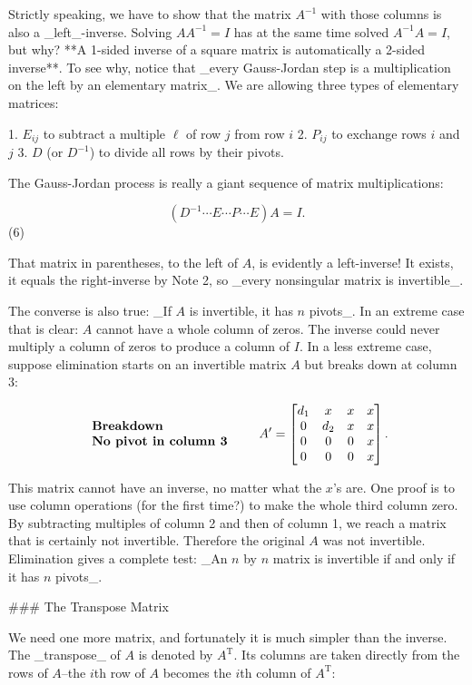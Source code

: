 Strictly speaking, we have to show that the matrix \(A^{-1}\) with those columns is also a _left_-inverse. Solving \(AA^{-1}=I\) has at the same time solved \(A^{-1}A=I\), but why? **A 1-sided inverse of a square matrix is automatically a 2-sided inverse**. To see why, notice that _every Gauss-Jordan step is a multiplication on the left by an elementary matrix_. We are allowing three types of elementary matrices:

1. \(E_{ij}\) to subtract a multiple \(\ell\) of row \(j\) from row \(i\)
2. \(P_{ij}\) to exchange rows \(i\) and \(j\)
3. \(D\) (or \(D^{-1}\)) to divide all rows by their pivots.

The Gauss-Jordan process is really a giant sequence of matrix multiplications:

\[(D^{-1}\cdots E\cdots P\cdots E)A=I.\] (6)

That matrix in parentheses, to the left of \(A\), is evidently a left-inverse! It exists, it equals the right-inverse by Note 2, so _every nonsingular matrix is invertible_.

The converse is also true: _If \(A\) is invertible, it has \(n\) pivots_. In an extreme case that is clear: \(A\) cannot have a whole column of zeros. The inverse could never multiply a column of zeros to produce a column of \(I\). In a less extreme case, suppose elimination starts on an invertible matrix \(A\) but breaks down at column 3:

\[\begin{array}{l}\mbox{\bf Breakdown}\\ \mbox{\bf No pivot in column 3}\end{array}\qquad A^{\prime}=\begin{bmatrix}d_{1}&x&x&x \\ 0&d_{2}&x&x\\ 0&0&0&x\\ 0&0&0&x\end{bmatrix}.\]

This matrix cannot have an inverse, no matter what the \(x\)'s are. One proof is to use column operations (for the first time?) to make the whole third column zero. By subtracting multiples of column 2 and then of column 1, we reach a matrix that is certainly not invertible. Therefore the original \(A\) was not invertible. Elimination gives a complete test: _An \(n\) by \(n\) matrix is invertible if and only if it has \(n\) pivots_.

### The Transpose Matrix

We need one more matrix, and fortunately it is much simpler than the inverse. The _transpose_ of \(A\) is denoted by \(A^{\mathrm{T}}\). Its columns are taken directly from the rows of \(A\)--the \(i\)th row of \(A\) becomes the \(i\)th column of \(A^{\mathrm{T}}\):

